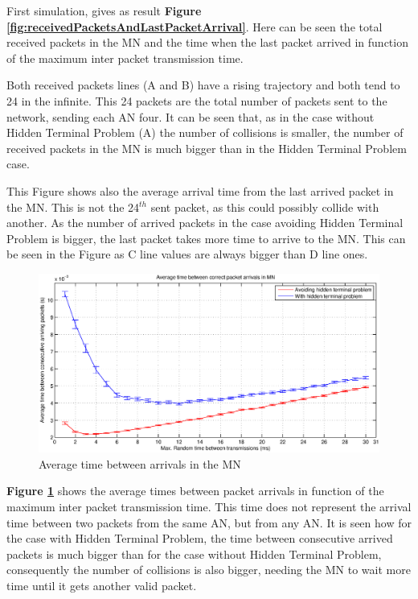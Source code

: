 First simulation, gives as result \textbf{Figure \ref{fig:receivedPacketsAndLastPacketArrival}}. Here can be seen the total received packets in the 
\ac{MN} and the time when the last packet arrived in function of the maximum inter packet transmission time.

Both received packets lines (A and B) have a rising trajectory and both tend to 24 in the infinite. This 24 packets are the total number of 
packets sent to the network, sending each \ac{AN} four. It can be seen that, as in the case without Hidden Terminal Problem (A) the number of collisions
is smaller, the number of received packets in the \ac{MN} is much bigger than in the Hidden Terminal Problem case.

This Figure shows also the average arrival time from the last arrived packet in the \ac{MN}. This is not the 24$^{th}$ sent packet, as this could 
possibly collide with another. As the number of arrived packets in the case avoiding Hidden Terminal Problem is bigger, the last packet takes more time 
to arrive to the \ac{MN}. This can be seen in the Figure as C line values are always bigger than D line ones.

\begin{figure}[ht]
 \begin{center}
  \includegraphics[width=1\textwidth]{averageTimeBetweenArrivals.eps}
 \end{center}
 \caption{Average time between arrivals in the \ac{MN}}
 \label{fig:averageTimeBetweenArrivals}
\end{figure}

\textbf{Figure \ref{fig:averageTimeBetweenArrivals}} shows the average times between packet arrivals in function of the maximum inter packet 
transmission time. This time does not represent the arrival time between two packets from the same \ac{AN}, but from any \ac{AN}. It is seen how
for the case with Hidden Terminal Problem, the time between consecutive arrived packets is much bigger than for the case without Hidden Terminal Problem,
consequently the number of collisions is also bigger, needing the \ac{MN} to wait more time until it gets another valid packet.

